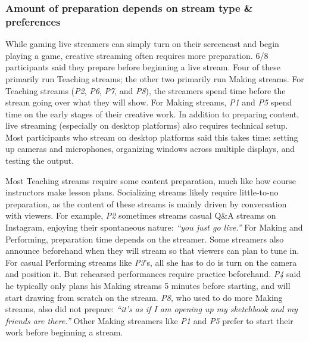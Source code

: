 \subsubsection{Amount of preparation depends on stream type \& preferences}
While gaming live streamers can simply turn on their screencast and begin playing a game, creative streaming often requires more preparation. 6/8 participants said they prepare before beginning a live stream. Four of these primarily run Teaching streams; the other two primarily run Making streams. For Teaching streams (\textit{P2}, \textit{P6}, \textit{P7}, and \textit{P8}), the streamers spend time before the stream going over what they will show. For Making streams, \textit{P1} and \textit{P5} spend time on the early stages of their creative work. In addition to preparing content, live streaming (especially on desktop platforms) also requires technical setup. Most participants who stream on desktop platforms said this takes time: setting up cameras and microphones, organizing windows across multiple displays, and testing the output.

Most Teaching streams require some content preparation, much like how course instructors make lesson plans. Socializing streams likely require little-to-no preparation, as the content of these streams is mainly driven by conversation with viewers. For example, \textit{P2} sometimes streams casual Q\&A streams on Instagram, enjoying their spontaneous nature: \textit{``you just go live.''} For Making and Performing, preparation time depends on the streamer. Some streamers also announce beforehand when they will stream so that viewers can plan to tune in.
For casual Performing streams like \textit{P3}'s, all she has to do is turn on the camera and position it. But rehearsed performances require practice beforehand. \textit{P4} said he typically only plans his Making streams 5 minutes before starting, and will start drawing from scratch on the stream. \textit{P8}, who used to do more Making streams, also did not prepare: \textit{``it's as if I am opening up my sketchbook and my friends are there.''} Other Making streamers like \textit{P1} and \textit{P5} prefer to start their work before beginning a stream.

